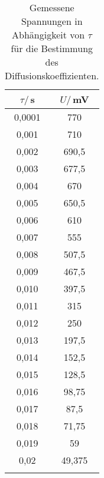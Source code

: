 \begin{table}[!htp]
\centering
\caption{Gemessene Spannungen in Abhängigkeit von $\tau$ für die Bestimmung des Diffusionskoeffizienten.}
\label{tab:diff}
\begin{tabular}{c c}
\toprule
{$\tau/$\,s} & {$U/$\,mV} \\
\midrule
0,0001 & 770 \\
0,001 & 710 \\
0,002 & 690,5 \\
0,003 & 677,5 \\
0,004 & 670 \\
0,005 & 650,5 \\
0,006 & 610 \\
0,007 & 555 \\
0,008 & 507,5 \\
0,009 & 467,5 \\
0,010 & 397,5 \\
0,011 & 315 \\
0,012 & 250 \\
0,013 & 197,5 \\
0,014 & 152,5 \\
0,015 & 128,5 \\
0,016 & 98,75 \\
0,017 & 87,5 \\
0,018 & 71,75 \\
0,019 & 59 \\
0,02 & 49,375 \\
 \\
\bottomrule
\end{tabular}
\end{table}